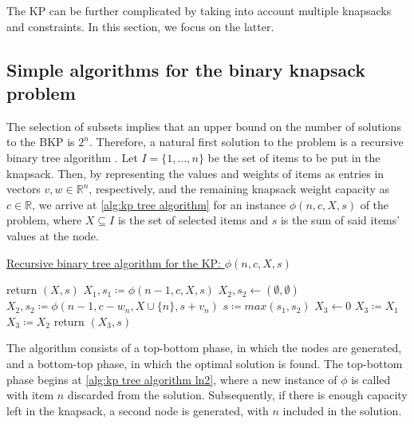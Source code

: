 The KP can be further complicated by taking into account multiple knapsacks and constraints. In this section, we focus on the latter.

\subsection{Simple algorithms for the binary knapsack problem}

The selection of subsets implies that an upper bound on the number of solutions to the BKP is $2^n$. Therefore, a natural first solution to the problem is a recursive binary tree algorithm \cite{FEOFILOFF2020a}. Let $I = \{1,\dots,n\}$ be the set of items to be put in the knapsack. Then, by representing the values and weights of items as entries in vectors $v, w \in \mathbb{R}^n$, respectively, and the remaining knapsack weight capacity as $c \in \mathbb{R}$, we arrive at \cref{alg:kp tree algorithm} for an instance $\phi(n, c, X, s)$ of the problem, where $X \subseteq I$ is the set of selected items and $s$ is the sum of said items' values at the node.

\begin{algorithm}
    \caption{\href{https://github.com/phcentenaro7/IC-Knapsack/blob/main/Knapsack/USP/recursive_knapsack.jl}{Recursive binary tree algorithm for the KP: $\phi(n, c, X, s)$}}
    \label{alg:kp tree algorithm}
    \begin{algorithmic}[1]
         \label{alg:kp tree algorithm ln1}
            \State return $(X, s)$
        \EndIf
        \State $X_1, s_1 \coloneqq \phi(n - 1, c, X, s)$ \label{alg:kp tree algorithm ln2}
        \State $X_2, s_2 \gets (\emptyset, \emptyset)$
            \State $X_2, s_2 \coloneqq \phi(n - 1, c - w_n, X \cup \{n\}, s + v_n)$
        \EndIf
        \State $s \coloneqq max(s_1, s_2)$ \label{alg:kp tree algorithm ln3}
        \State $X_3 \gets 0$
            \State $X_3 \coloneqq X_1$
        \Else
            \State $X_3 \coloneqq X_2$
        \EndIf
        \State return $(X_3, s)$
    \end{algorithmic}
\end{algorithm}

The algorithm consists of a top-bottom phase, in which the nodes are generated, and a bottom-top phase, in which the optimal solution is found. The top-bottom phase begins at \cref{alg:kp tree algorithm ln2}, where a new instance of $\phi$ is called with item $n$ discarded from the solution. Subsequently, if there is enough capacity left in the knapsack, a second node is generated, with $n$ included in the solution.

